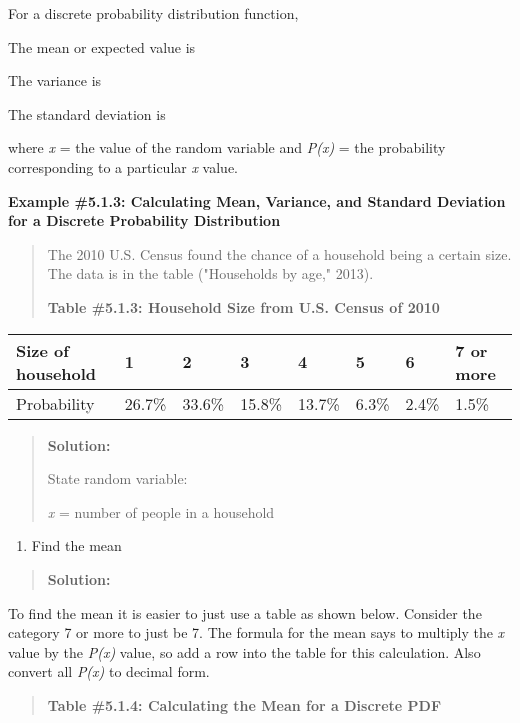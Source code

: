 \documentclass[]{book}
\providecommand{\tightlist}{%
  \setlength{\itemsep}{0pt}\setlength{\parskip}{0pt}}
\begin{document}
For a discrete probability distribution function,

The mean or expected value is

The variance is

The standard deviation is

where \emph{x} = the value of the random variable and \emph{P(x)} = the
probability corresponding to a particular \emph{x} value.

\textbf{Example \#5.1.3: Calculating Mean, Variance, and Standard Deviation
for a Discrete Probability Distribution}

\begin{quote}
The 2010 U.S. Census found the chance of a household being a certain
size. The data is in the table ("Households by age," 2013).

\textbf{Table \#5.1.3: Household Size from U.S. Census of 2010}
\end{quote}

\begin{longtable}[]{@{}llllllll@{}}
\toprule
Size of household & 1 & 2 & 3 & 4 & 5 & 6 & 7 or more\tabularnewline
\midrule
\endhead
Probability & 26.7\% & 33.6\% & 15.8\% & 13.7\% & 6.3\% & 2.4\% & 1.5\%\tabularnewline
\bottomrule
\end{longtable}

\begin{quote}
\textbf{Solution:}

State random variable:

\emph{x} = number of people in a household
\end{quote}

\begin{enumerate}
\def\labelenumi{\alph{enumi}.}
\tightlist
\item
  Find the mean
\end{enumerate}

\begin{quote}
\textbf{Solution:}
\end{quote}

To find the mean it is easier to just use a table as shown below.
Consider the category 7 or more to just be 7. The formula for the mean
says to multiply the \emph{x} value by the \emph{P(x)} value, so add a row into
the table for this calculation. Also convert all \emph{P(x)} to decimal form.

\begin{quote}
\textbf{Table \#5.1.4: Calculating the Mean for a Discrete PDF}
\end{quote}
\end{document}
